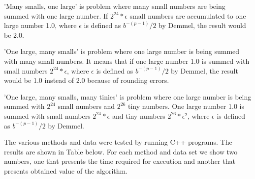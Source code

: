 \documentclass[conference]{IEEEtran}
\begin{document}
\par
'Many smalls, one large' is problem where many small numbers 
are being summed with one large number. If $2^24 *\epsilon$ small 
numbers are accumulated to one large number 1.0, where $\epsilon$ 
is defined as $b^{-(p-1)}/2$ by Demmel, the result would be 2.0. 
\par 
'One large, many smalls' is problem where one large number 
is being summed with many small numbers. It means that
if one large number 1.0 is summed with small 
numbers $2^24 *\epsilon$, where $\epsilon$ is defined 
as $b^{-(p-1)}/2$ by Demmel, the result would be 1.0 instead 
of 2.0 because of rounding errors.
\par 
'One large, many smalls, many tinies' is problem where one 
large number is being summed with $2^24$ small numbers and $2^26$
tiny numbers. One large number 1.0 is 
summed with small numbers $2^24 *\epsilon$ and tiny 
numbers $2^26 *\epsilon^2$, where $\epsilon$ is defined as $b^{-(p-1)}/2$ by Demmel.
\par
The various methods and data were tested by running C++ programs.
The results are shown in Table below. For each method and data 
set we show two numbers, one that presents the time required for 
execution and another that presents obtained value of the algorithm.
\end{document}
